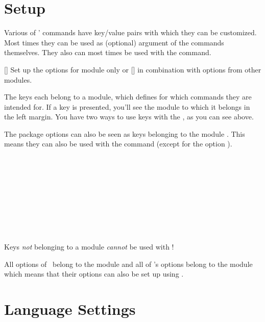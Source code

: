 \documentclass[load-preamble+]{cnltx-doc}
\begin{document}
\section{Setup}\label{sec:setup}
Various of \chemmacros' commands have key/value pairs with which they can be
customized.  Most times they can be used as (optional) argument of the
commands themselves.  They also can most times be used with the 
command.
\begin{commands}
  []
    Set up the options for module  only or
  []
    in combination with options from other modules.
\end{commands}
The keys each belong to a module, which defines for which commands they are
intended for.  If a key is presented, you'll see the module to which it
belongs in the left margin.  You have two ways to use keys with the
, as you can see above.

The package options can also be seen as keys belonging to the module
.  This means they can also be used with the 
command (except for the option ).
\begin{example}
    \leavevmode\mch\ \pch\ \fmch\ \fpch\ \el\ \prt \par
    \leavevmode\mch\ \pch\ \fmch\ \fpch\ \el\ \prt \par
    \leavevmode\mch\ \pch\ \fmch\ \fpch\ \el\ \prt \par
    \leavevmode\mch\ \pch\ \fmch\ \fpch\ \el\ \prt \par
    \leavevmode\mch\ \pch\ \fmch\ \fpch\ \el\ \prt
\end{example}
Keys \emph{not} belonging to a module \emph{cannot} be used with
!

All options of \chemformula\ belong to the module  and all
of \ghsystem's options belong to the module  which means that
their options can also be set up using .


\section{Language Settings}\label{sec:languages}
\end{document}
